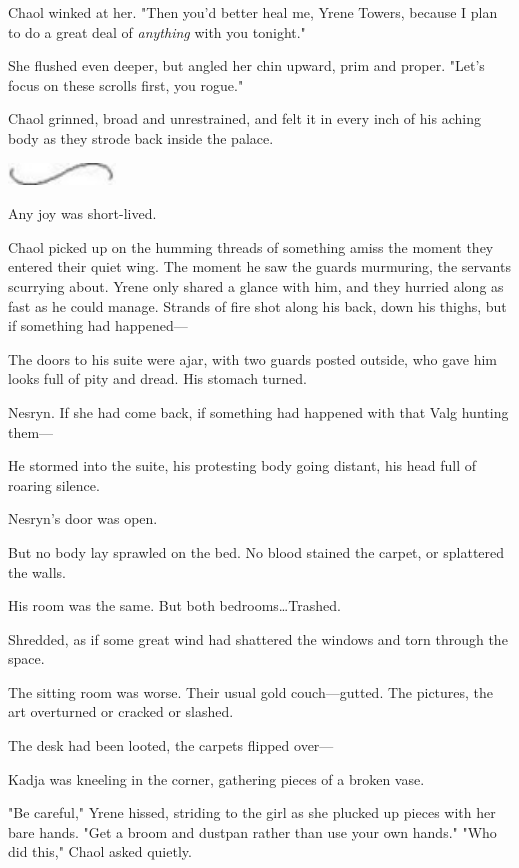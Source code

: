 Chaol winked at her.
"Then you'd better heal me, Yrene Towers, because I plan to do a great deal of \emph{anything} with you tonight."

She flushed even deeper, but angled her chin upward, prim and proper.
"Let's focus on these scrolls first, you rogue."

Chaol grinned, broad and unrestrained, and felt it in every inch of his aching body as they strode back inside the palace.

\begin{center}
	\includegraphics[width=1.12in,height=0.24in]{images/seperator}
\end{center}

Any joy was short-lived.

Chaol picked up on the humming threads of something amiss the moment they entered their quiet wing.
The moment he saw the guards murmuring, the servants scurrying about.
Yrene only shared a glance with him, and they hurried along as fast as he could manage.
Strands of fire shot along his back, down his thighs, but if something had happened---

The doors to his suite were ajar, with two guards posted outside, who gave him looks full of pity and dread.
His stomach turned.

Nesryn.
If she had come back, if something had happened with that Valg hunting them---

He stormed into the suite, his protesting body going distant, his head full of roaring silence.

Nesryn's door was open.

But no body lay sprawled on the bed.
No blood stained the carpet, or splattered the walls.

His room was the same.
But both bedrooms\ldots Trashed.

Shredded, as if some great wind had shattered the windows and torn through the space.

The sitting room was worse.
Their usual gold couch---gutted.
The pictures, the art overturned or cracked or slashed.

The desk had been looted, the carpets flipped over---

Kadja was kneeling in the corner, gathering pieces of a broken vase.

"Be careful," Yrene hissed, striding to the girl as she plucked up pieces with her bare hands.
"Get a broom and dustpan rather than use your own hands."
"Who did this," Chaol asked quietly.

